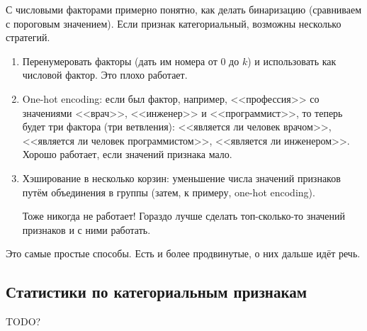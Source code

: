 \documentclass[a4paper,12pt]{article}
\begin{document}
С числовыми факторами примерно понятно, как делать бинаризацию (сравниваем с пороговым значением).
Если признак категориальный, возможны несколько стратегий.
\begin{enumerate}[noitemsep]
    \item Перенумеровать факторы (дать им номера от $0$ до $k$) и использовать как числовой фактор.
    Это плохо работает.
    \item One-hot encoding: если был фактор, например, <<профессия>> со значениями <<врач>>, <<инженер>> и <<программист>>, то теперь будет три фактора (три ветвления): <<является ли человек врачом>>, <<является ли человек программистом>>, <<является ли инженером>>.
    Хорошо работает, если значений признака мало.
    \item Хэширование в несколько корзин: уменьшение числа значений признаков путём объединения в группы (затем, к примеру, one-hot encoding).

    Тоже никогда не работает!
    Гораздо лучше сделать топ-сколько-то значений признаков и с ними работать.
\end{enumerate}

Это самые простые способы. Есть и более продвинутые, о них дальше идёт речь.

\subsection{Статистики по категориальным признакам}

TODO?
\end{document}
